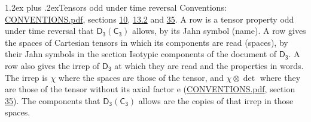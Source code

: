 \documentclass[10pt,a4paper]{article}
\makeatletter
\renewcommand\section{\@startsection{section}{1}{\z@}{-3ex plus -1ex minus -.2ex}%
  {1.2ex plus .2ex}{\normalfont\large\sffamily\bfseries\color{parttitle}}}
\numberwithin{equation}{section}
\newcommand{\grp}[1]{\mathsf{#1}}
\newcommand{\irrprod}{\otimes}
\makeatother
\begin{document}
\section{Tensors odd under time reversal}\label{s:time_odd}
Conventions: \href{../../CONVENTIONS.pdf}{CONVENTIONS.pdf}, sections \href{../../../rotation/CONVENTIONS.pdf\#conv.10}{10}, \href{../../../rotation/CONVENTIONS.pdf\#conv.13.2}{13.2} and \href{../../CONVENTIONS.pdf\#conv.35}{35}.
\leavevmode\label{n:head.name.property}A row is a tensor property odd under time reversal that $\grp{D_{3}}(\grp{C_{3}})$ allows, by its Jahn symbol (name). \label{n:head.spaces}A row gives the spaces of Cartesian tensors in which its components are read (spaces), by their Jahn symbols in the section Isotypic components of the document of \href{../../../rotation/data/pdf/D3.pdf}{$\grp{D_{3}}$}. \label{n:head.properties}A row also gives the irrep of $\grp{D_{3}}$ at which they are read and the properties in words. The irrep is $\chi$ where the spaces are those of the tensor, and $\chi \irrprod \det$ where they are those of the tensor without its axial factor e (\href{../../CONVENTIONS.pdf}{CONVENTIONS.pdf}, section \href{../../CONVENTIONS.pdf\#conv.35}{35}). The components that $\grp{D_{3}}(\grp{C_{3}})$ allows are the copies of that irrep in those spaces.
\end{document}
